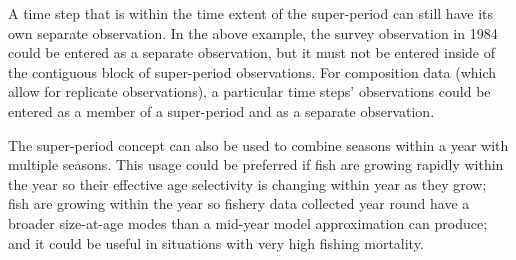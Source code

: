 A time step that is within the time extent of the super-period can still have its own separate observation. In the above example, the survey observation in 1984 could be entered as a separate observation, but it must not be entered inside of the contiguous block of super-period observations. For composition data (which allow for replicate observations), a particular time steps' observations could be entered as a member of a super-period and as a separate observation.

The super-period concept can also be used to combine seasons within a year with multiple seasons. This usage could be preferred if fish are growing rapidly within the year so their effective age selectivity is changing within year as they grow; fish are growing within the year so fishery data collected year round have a broader size-at-age modes than a mid-year model approximation can produce; and it could be useful in situations with very high fishing mortality.

\pagebreak
